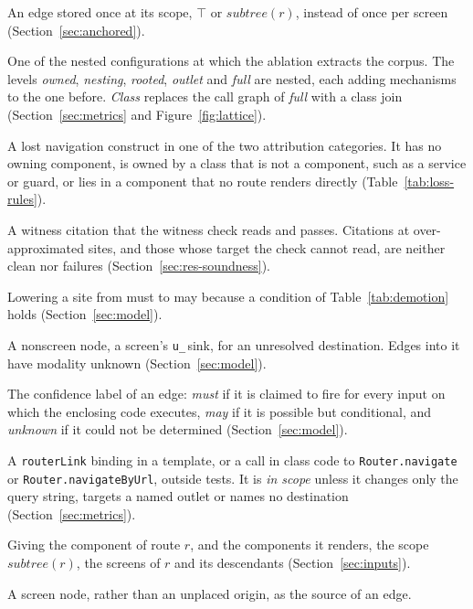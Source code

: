 \documentclass[english,12pt,a4paper,sci,utf8,a-2b,online]{aaltothesis}
\numberwithin{table}{section}
\numberwithin{figure}{section}
\numberwithin{equation}{section}
\begin{document}
\begin{description}[nosep]
\item[Anchored edge] An edge stored once at its scope, $\top$ or $\mathit{subtree}(r)$, instead of
once per screen (Section~\ref{sec:anchored}).
\item[Attribution level] One of the nested configurations at which the ablation extracts the
corpus. The levels \emph{owned}, \emph{nesting}, \emph{rooted}, \emph{outlet} and \emph{full}
are nested, each adding mechanisms to the one before. \emph{Class} replaces the call graph of \emph{full} with a
class join (Section~\ref{sec:metrics} and Figure~\ref{fig:lattice}).
\item[Attribution loss] A lost navigation construct in one of the two attribution categories. It
has no owning component, is owned by a class that is not a component, such as a service or guard,
or lies in a component that no route renders directly (Table~\ref{tab:loss-rules}).
\item[Clean citation] A witness citation that the witness check reads and passes. Citations at
over-approximated sites, and those whose target the check cannot read, are neither clean nor
failures (Section~\ref{sec:res-soundness}).
\item[Demotion] Lowering a site from must to may because a condition of Table~\ref{tab:demotion}
holds (Section~\ref{sec:model}).
\item[Dynamic target, dynamic sink] A nonscreen node, a screen's \texttt{u\_}\,sink, for an
unresolved destination. Edges into it have modality unknown (Section~\ref{sec:model}).
\item[Modality] The confidence label of an edge: \emph{must} if it is claimed to fire for every
input on which the enclosing code executes, \emph{may} if it is possible but conditional, and
\emph{unknown} if it could not be determined (Section~\ref{sec:model}).
\item[Navigation construct] A \texttt{routerLink} binding in a template, or a call in class code to
\texttt{Router.navigate} or \texttt{Router.navigateByUrl}, outside tests. It is
\emph{in scope} unless it changes only the query string, targets a named outlet or names no
destination (Section~\ref{sec:metrics}).
\item[Outlet descent] Giving the component of route $r$, and the components it renders, the scope
$\mathit{subtree}(r)$, the screens of $r$ and its descendants (Section~\ref{sec:inputs}).
\item[Placed screen] A screen node, rather than an unplaced origin, as the source of an edge.

\end{description}
\end{document}
